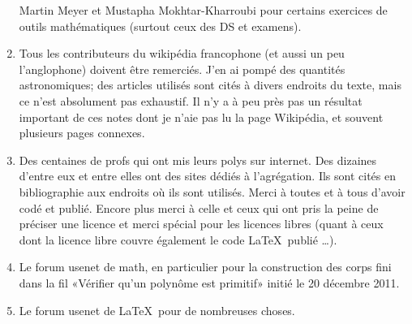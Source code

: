 \begin{enumerate}
        Martin Meyer et Mustapha Mokhtar-Kharroubi pour certains exercices de outils mathématiques (surtout ceux des DS et examens).
    \item
        Tous les contributeurs du wikipédia francophone (et aussi un peu l'anglophone) doivent être remerciés. J'en ai pompé des quantités astronomiques; des articles utilisés sont cités à divers endroits du texte, mais ce n'est absolument pas exhaustif. Il n'y a à peu près pas un résultat important de ces notes dont je n'aie pas lu la page Wikipédia, et souvent plusieurs pages connexes.
    \item
        Des centaines de profs qui ont mis leurs polys sur internet. Des dizaines d'entre eux et entre elles ont des sites dédiés à l'agrégation. Ils sont cités en bibliographie aux endroits où ils sont utilisés. Merci à toutes et à tous d'avoir codé et publié. Encore plus merci à celle et ceux qui ont pris la peine de préciser une licence et merci spécial pour les licences libres (quant à ceux dont la licence libre couvre également le code \LaTeX\ publié \ldots).
    \item
        Le forum usenet de math, en particulier pour la construction des corps fini dans la fil «Vérifier qu'un polynôme est primitif» initié le 20 décembre 2011.
    \item
        Le forum usenet de \LaTeX\ pour de nombreuses choses.
\end{enumerate}

